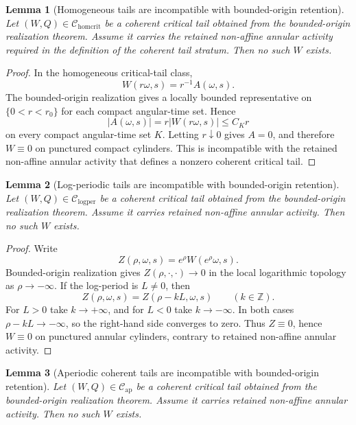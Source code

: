 \documentclass[11pt]{amsart}
\numberwithin{equation}{section}
\theoremstyle{plain}
\newtheorem{lemma}[lemma]{Lemma}
\theoremstyle{definition}
\theoremstyle{remark}
\newcommand{\Chomcrit}{\mathcal C_{\mathrm{homcrit}}}
\newcommand{\Clogper}{\mathcal C_{\mathrm{logper}}}
\newcommand{\Capcrit}{\mathcal C_{\mathrm{ap}}}
\begin{document}
\begin{lemma}[Homogeneous tails are incompatible with bounded-origin retention]
\label{lem:homogeneous-tail-bounded-origin-closure}
Let \((W,Q)\in\Chomcrit\) be a coherent critical tail obtained from the
bounded-origin realization theorem.  Assume it carries the retained non-affine
annular activity required in the definition of the coherent tail stratum.  Then
no such \(W\) exists.
\end{lemma}

\begin{proof}
In the homogeneous critical-tail class,
\[
   W(r\omega,s)=r^{-1}A(\omega,s).
\]
The bounded-origin realization gives a locally bounded representative on
\(\{0<r<r_0\}\) for each compact angular-time set.  Hence
\[
   |A(\omega,s)|=r|W(r\omega,s)|\le C_K r
\]
on every compact angular-time set \(K\).  Letting \(r\downarrow0\) gives
\(A=0\), and therefore \(W\equiv0\) on punctured compact cylinders.  This is
incompatible with the retained non-affine annular activity that defines a
nonzero coherent critical tail.
\end{proof}

\begin{lemma}[Log-periodic tails are incompatible with bounded-origin retention]
\label{lem:logperiodic-tail-bounded-origin-closure}
Let \((W,Q)\in\Clogper\) be a coherent critical tail obtained from the
bounded-origin realization theorem.  Assume it carries retained non-affine
annular activity.  Then no such \(W\) exists.
\end{lemma}

\begin{proof}
Write
\[
   Z(\rho,\omega,s)=e^\rho W(e^\rho\omega,s).
\]
Bounded-origin realization gives \(Z(\rho,\cdot,\cdot)\to0\) in the local
logarithmic topology as \(\rho\to-\infty\).  If the log-period is
\(L\ne0\), then
\[
   Z(\rho,\omega,s)=Z(\rho-kL,\omega,s)
   \qquad(k\in\mathbb Z).
\]
For \(L>0\) take \(k\to+\infty\), and for \(L<0\) take \(k\to-\infty\).  In
both cases \(\rho-kL\to-\infty\), so the right-hand side converges to zero.
Thus \(Z\equiv0\), hence \(W\equiv0\) on punctured annular cylinders, contrary
to retained non-affine annular activity.
\end{proof}

\begin{lemma}[Aperiodic coherent tails are incompatible with bounded-origin retention]
\label{lem:aperiodic-tail-bounded-origin-closure}
Let \((W,Q)\in\Capcrit\) be a coherent critical tail obtained from the
bounded-origin realization theorem.  Assume it carries retained non-affine
annular activity.  Then no such \(W\) exists.
\end{lemma}
\end{document}
